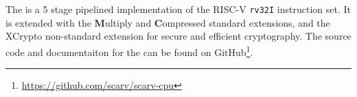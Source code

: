 
The \SCARVCPU is a 5 stage pipelined implementation of the RISC-V
{\tt rv32I} instruction set.
It is extended with the {\bf M}ultiply and {\bf C}ompressed standard
extensions, and the XCrypto non-standard extension for secure and
efficient cryptography.
The source code and documentaiton
for the \SCARVCPU can be found on
GitHub\footnote{\url{https://github.com/scarv/scarv-cpu}}.

